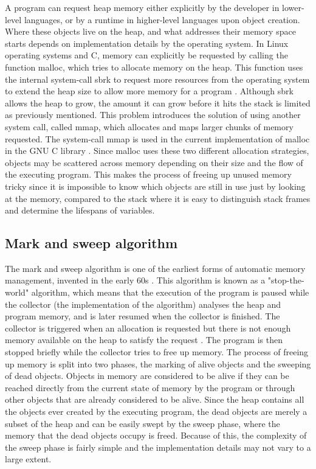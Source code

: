 A program can request heap memory either explicitly by the developer in lower-level languages, or by
a runtime in higher-level languages upon object creation. Where these objects live on the heap, and
what addresses their memory space starts depends on implementation details by the operating system.
In Linux operating systems and C, memory can explicitly be requested by calling the function
malloc, which tries to allocate memory on the heap. This function uses the internal system-call sbrk
to request more resources from the operating system to extend the heap size to allow
more memory for a program \citep[p.~188]{KandR}. Although sbrk allows the heap to grow, the amount it
can grow before it hits the stack is limited as previously mentioned. This problem introduces
the solution of using another system call, called mmap, which allocates and maps larger chunks of memory
requested. The system-call mmap is used in the current implementation of malloc in the GNU C library \citep{mallocSrcCode}.
Since malloc uses these two different allocation strategies, objects may be scattered across memory
depending on their size and the flow of the executing program. This makes the process of freeing
up unused memory tricky since it is impossible to know which objects are still in use just by
looking at the memory, compared to the stack where it is easy to distinguish stack frames and determine
the lifespans of variables.

\subsection{Mark and sweep algorithm}
The mark and sweep algorithm is one of the earliest forms of automatic memory management, invented
in the early 60s \citep{MandSproject}. This algorithm is known as a "stop-the-world" algorithm,
which means that the execution of the program is paused while the collector (the implementation
of the algorithm) analyses the heap and program memory, and is later resumed when the collector
is finished. The collector is triggered when an allocation is requested but
there is not enough memory available on the heap to satisfy the request \citep[p.~18]{gcollHandbook}.
The program is then
stopped briefly while the collector tries to free up memory. The process of freeing up memory is
split into two phases, the marking of alive objects and the sweeping of dead objects. Objects in
memory are considered to be alive if they can be reached directly from the current state of
memory by the program or through other objects that are already considered to be alive.
Since the heap contains all the objects ever created by the executing program, the dead objects
are merely a subset of the heap and can be easily swept by the sweep phase, where the memory
that the dead objects occupy is freed. Because of this, the complexity of the sweep phase
is fairly simple and the implementation details may not vary to a large extent.\\

